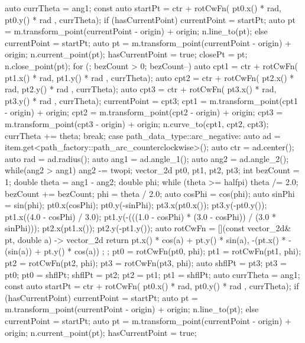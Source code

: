 \begin{codeblock}
{{{    auto currTheta = ang1;
    const auto startPt =
      ctr + rotCwFn({ pt0.x() * rad, pt0.y() * rad }, currTheta);
    if (hasCurrentPoint) {
      currentPoint = startPt;
      auto pt = m.transform_point(currentPoint - origin) + origin;
      n.line_to(pt);
    }
    else {
      currentPoint = startPt;
      auto pt = m.transform_point(currentPoint - origin) + origin;
      n.current_point(pt);
      hasCurrentPoint = true;
      closePt = pt;
      n.close_point(pt);
    }
    for (; bezCount > 0; bezCount--) {
      auto cpt1 = ctr + rotCwFn({ pt1.x() * rad, pt1.y() * rad }, currTheta);
      auto cpt2 = ctr + rotCwFn({ pt2.x() * rad, pt2.y() * rad }, currTheta);
      auto cpt3 = ctr + rotCwFn({ pt3.x() * rad, pt3.y() * rad }, currTheta);
      currentPoint = cpt3;
      cpt1 = m.transform_point(cpt1 - origin) + origin;
      cpt2 = m.transform_point(cpt2 - origin) + origin;
      cpt3 = m.transform_point(cpt3 - origin) + origin;
      n.curve_to(cpt1, cpt2, cpt3);
      currTheta += theta;
    }
  } break;
  case path_data_type::arc_negative:
  {
    auto ad = item.get<path_factory::path_arc_counterclockwise>();
    auto ctr = ad.center();
    auto rad = ad.radius();
    auto ang1 = ad.angle_1();
    auto ang2 = ad.angle_2();
    while(ang2 > ang1) {
      ang2 -= twopi;
    }
    vector_2d pt0, pt1, pt2, pt3;
    int bezCount = 1;
    double theta = ang1 - ang2;
    double phi;
    while (theta >= halfpi) {
      theta /= 2.0;
      bezCount += bezCount;
    }
    phi = theta / 2.0;
    auto cosPhi = cos(phi);
    auto sinPhi = sin(phi);
    pt0.x(cosPhi);
    pt0.y(-sinPhi);
    pt3.x(pt0.x());
    pt3.y(-pt0.y());
    pt1.x((4.0 - cosPhi) / 3.0);
    pt1.y(-(((1.0 - cosPhi) * (3.0 - cosPhi)) / (3.0 * sinPhi)));
    pt2.x(pt1.x());
    pt2.y(-pt1.y());
    auto rotCwFn = [](const vector_2d& pt, double a) -> vector_2d {
      return { pt.x() * cos(a) + pt.y() * sin(a),
        -(pt.x() * -(sin(a)) + pt.y() * cos(a)) };
    };
    pt0 = rotCwFn(pt0, phi);
    pt1 = rotCwFn(pt1, phi);
    pt2 = rotCwFn(pt2, phi);
    pt3 = rotCwFn(pt3, phi);
    auto shflPt = pt3;
    pt3 = pt0;
    pt0 = shflPt;
    shflPt = pt2;
    pt2 = pt1;
    pt1 = shflPt;
    auto currTheta = ang1;
    const auto startPt =
      ctr + rotCwFn({ pt0.x() * rad, pt0.y() * rad }, currTheta);
    if (hasCurrentPoint) {
      currentPoint = startPt;
      auto pt = m.transform_point(currentPoint - origin) + origin;
      n.line_to(pt);
    }
    else {
      currentPoint = startPt;
      auto pt = m.transform_point(currentPoint - origin) + origin;
      n.current_point(pt);
      hasCurrentPoint = true;
}}}}
\end{codeblock}
